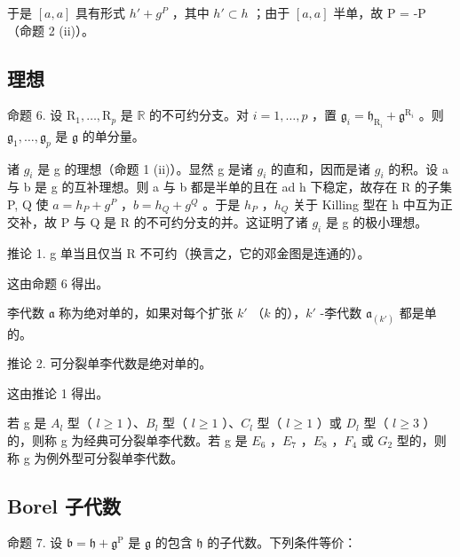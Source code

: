 于是 \([a, a]\) 具有形式 \(h' + g^{P}\) ，其中 \(h' \subset h\) ；由于 \([a, a]\) 半单，故 P = -P （命题 2 (ii)）。

\subsection{理想}

命题 6. 设 \(\mathrm{R}_1, \ldots, \mathrm{R}_p\) 是 \(\mathbb{R}\) 的不可约分支。对 \(i = 1, \ldots, p\) ，置 \(\mathfrak{g}_i = \mathfrak{h}_{\mathrm{R}_i} + \mathfrak{g}^{\mathrm{R}_i}\) 。则 \(\mathfrak{g}_1, \ldots, \mathfrak{g}_p\) 是 \(\mathfrak{g}\) 的单分量。

诸 \(g_{i}\) 是 g 的理想（命题 1 (ii)）。显然 g 是诸 \(g_{i}\) 的直和，因而是诸 \(g_{i}\) 的积。设 a 与 b 是 g 的互补理想。则 a 与 b 都是半单的且在 ad h 下稳定，故存在 R 的子集 P, Q 使 \(a = h_{P} + g^{P}\) ，\(b = h_{Q} + g^{Q}\) 。于是 \(h_{P}\) ，\(h_{Q}\) 关于 Killing 型在 h 中互为正交补，故 P 与 Q 是 R 的不可约分支的并。这证明了诸 \(g_{i}\) 是 g 的极小理想。

推论 1. g 单当且仅当 R 不可约（换言之，它的邓金图是连通的）。

这由命题 6 得出。

李代数 \(\mathfrak{a}\) 称为绝对单的，如果对每个扩张 \(k'\) （\(k\) 的），\(k'\) -李代数 \(\mathfrak{a}_{(k')}\) 都是单的。

推论 2. 可分裂单李代数是绝对单的。

这由推论 1 得出。

若 g 是 \(A_{l}\) 型（ \(l \geq 1\) ）、\(B_{l}\) 型（ \(l \geq 1\) ）、\(C_{l}\) 型（ \(l \geq 1\) ）或 \(D_{l}\) 型（ \(l \geq 3\) ）的，则称 g 为经典可分裂单李代数。若 g 是 \(E_{6}\) ，\(E_{7}\) ，\(E_{8}\) ，\(F_{4}\) 或 \(G_{2}\) 型的，则称 g 为例外型可分裂单李代数。

\subsection{Borel 子代数}

命题 7. 设 \(\mathfrak{b} = \mathfrak{h} + \mathfrak{g}^{\mathrm{P}}\) 是 \(\mathfrak{g}\) 的包含 \(\mathfrak{h}\) 的子代数。下列条件等价：

